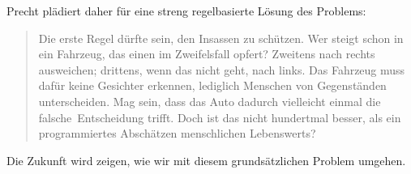 \documentclass[twoside,a4paper,12pt]{article}
\begin{document}
\noindent Precht plädiert daher für eine streng regelbasierte Lösung des Problems:

\begin{quote}
\glqq
Die erste Regel dürfte sein, den Insassen zu schützen. Wer steigt schon in ein Fahrzeug, das einen im Zweifelsfall opfert? Zweitens nach rechts ausweichen; drittens,
wenn das nicht geht, nach links. Das Fahrzeug muss dafür keine Gesichter erkennen, lediglich Menschen von Gegenständen unterscheiden. Mag sein, dass das Auto
dadurch vielleicht einmal die \glq falsche\grq\ Entscheidung trifft. Doch ist das nicht hundertmal besser, als ein programmiertes Abschätzen menschlichen Lebenswerts?\grqq\mbox{~\cite[S. 79]{pr}}
\end{quote}

\noindent Die Zukunft wird zeigen, wie wir mit diesem grundsätzlichen Problem umgehen.

\newpage

\end{document}
